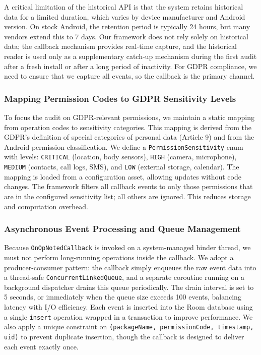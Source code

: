 A critical limitation of the historical API is that the system retains historical data for a limited duration, which varies by device manufacturer and Android version. On stock Android, the retention period is typically 24 hours, but many vendors extend this to 7 days. Our framework does not rely solely on historical data; the callback mechanism provides real-time capture, and the historical reader is used only as a supplementary catch-up mechanism during the first audit after a fresh install or after a long period of inactivity. For GDPR compliance, we need to ensure that we capture all events, so the callback is the primary channel.

\subsubsection{Mapping Permission Codes to GDPR Sensitivity Levels}

To focus the audit on GDPR-relevant permissions, we maintain a static mapping from operation codes to sensitivity categories. This mapping is derived from the GDPR's definition of special categories of personal data (Article 9) and from the Android permission classification. We define a \texttt{PermissionSensitivity} enum with levels: \texttt{CRITICAL} (location, body sensors), \texttt{HIGH} (camera, microphone), \texttt{MEDIUM} (contacts, call logs, SMS), and \texttt{LOW} (external storage, calendar). The mapping is loaded from a configuration asset, allowing updates without code changes. The framework filters all callback events to only those permissions that are in the configured sensitivity list; all others are ignored. This reduces storage and computation overhead.

\subsubsection{Asynchronous Event Processing and Queue Management}

Because \texttt{OnOpNotedCallback} is invoked on a system-managed binder thread, we must not perform long-running operations inside the callback. We adopt a producer-consumer pattern: the callback simply enqueues the raw event data into a thread-safe \texttt{ConcurrentLinkedQueue}, and a separate coroutine running on a background dispatcher drains this queue periodically. The drain interval is set to 5 seconds, or immediately when the queue size exceeds 100 events, balancing latency with I/O efficiency. Each event is inserted into the Room database using a single \texttt{insert} operation wrapped in a transaction to improve performance. We also apply a unique constraint on \texttt{(packageName, permissionCode, timestamp, uid)} to prevent duplicate insertion, though the callback is designed to deliver each event exactly once.

